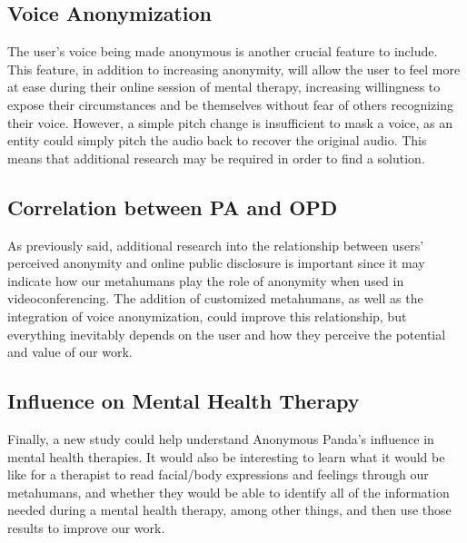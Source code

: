 \subsection{Voice Anonymization}
The user's voice being made anonymous is another crucial feature to include. This feature, in addition to increasing anonymity, will allow the user to feel more at ease during their online session of mental therapy, increasing willingness to expose their circumstances and be themselves without fear of others recognizing their voice. However, a simple pitch change is insufficient to mask a voice, as an entity could simply pitch the audio back to recover the original audio. This means that additional research may be required in order to find a solution.

\subsection{Correlation between PA and OPD}
As previously said, additional research into the relationship between users' perceived anonymity and online public disclosure is important since it may indicate how our metahumans play the role of anonymity when used in videoconferencing. The addition of customized metahumans, as well as the integration of voice anonymization, could improve this relationship, but everything inevitably depends on the user and how they perceive the potential and value of our work.


\subsection{Influence on Mental Health Therapy}
Finally, a new study could help understand Anonymous Panda’s influence in mental health therapies. It would also be interesting to learn what it would be like for a therapist to read facial/body expressions and feelings through our metahumans, and whether they would be able to identify all of the information needed during a mental health therapy, among other things, and then use those results to improve our work.

